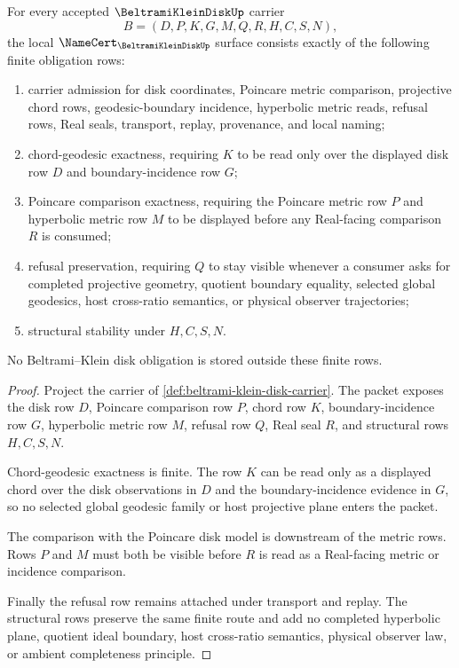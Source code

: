 \begin{theorem}
\label{thm:beltrami-klein-disk-namecert-obligations}
For every accepted $\BeltramiKleinDiskUp$ carrier
$$
B=(D,P,K,G,M,Q,R,H,C,S,N),
$$
the local $\NameCert_{\BeltramiKleinDiskUp}$ surface consists exactly of the following finite obligation rows:
\begin{enumerate}
\item carrier admission for disk coordinates, Poincare metric comparison, projective chord rows, geodesic-boundary incidence, hyperbolic metric reads, refusal rows, Real seals, transport, replay, provenance, and local naming;
\item chord-geodesic exactness, requiring $K$ to be read only over the displayed disk row $D$ and boundary-incidence row $G$;
\item Poincare comparison exactness, requiring the Poincare metric row $P$ and hyperbolic metric row $M$ to be displayed before any Real-facing comparison $R$ is consumed;
\item refusal preservation, requiring $Q$ to stay visible whenever a consumer asks for completed projective geometry, quotient boundary equality, selected global geodesics, host cross-ratio semantics, or physical observer trajectories;
\item structural stability under $H,C,S,N$.
\end{enumerate}
No Beltrami--Klein disk obligation is stored outside these finite rows.
\end{theorem}
\begin{proof}
Project the carrier of \autoref{def:beltrami-klein-disk-carrier}. The packet exposes the disk row $D$, Poincare comparison row $P$, chord row $K$, boundary-incidence row $G$, hyperbolic metric row $M$, refusal row $Q$, Real seal $R$, and structural rows $H,C,S,N$.

Chord-geodesic exactness is finite. The row $K$ can be read only as a displayed chord over the disk observations in $D$ and the boundary-incidence evidence in $G$, so no selected global geodesic family or host projective plane enters the packet.

The comparison with the Poincare disk model is downstream of the metric rows. Rows $P$ and $M$ must both be visible before $R$ is read as a Real-facing metric or incidence comparison.

Finally the refusal row remains attached under transport and replay. The structural rows preserve the same finite route and add no completed hyperbolic plane, quotient ideal boundary, host cross-ratio semantics, physical observer law, or ambient completeness principle.
\end{proof}

